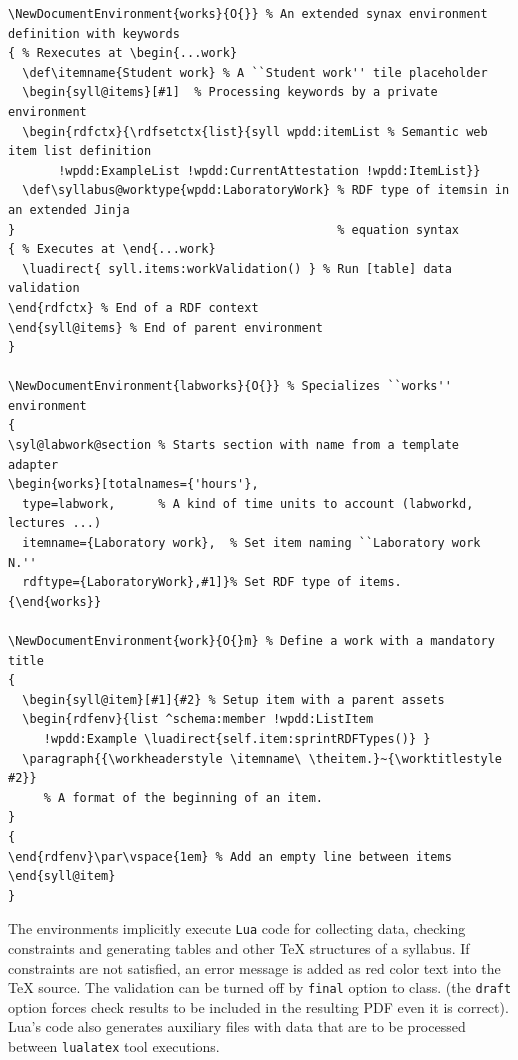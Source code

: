 \documentclass[
]{aiitart}
\begin{document}
\begin{verbatim}
\NewDocumentEnvironment{works}{O{}} % An extended synax environment definition with keywords
{ % Rexecutes at \begin{...work}
  \def\itemname{Student work} % A ``Student work'' tile placeholder
  \begin{syll@items}[#1]  % Processing keywords by a private environment
  \begin{rdfctx}{\rdfsetctx{list}{syll wpdd:itemList % Semantic web item list definition
       !wpdd:ExampleList !wpdd:CurrentAttestation !wpdd:ItemList}}
  \def\syllabus@worktype{wpdd:LaboratoryWork} % RDF type of itemsin in an extended Jinja
}                                             % equation syntax
{ % Executes at \end{...work}
  \luadirect{ syll.items:workValidation() } % Run [table] data validation
\end{rdfctx} % End of a RDF context
\end{syll@items} % End of parent environment
}

\NewDocumentEnvironment{labworks}{O{}} % Specializes ``works'' environment
{
\syl@labwork@section % Starts section with name from a template adapter
\begin{works}[totalnames={'hours'},
  type=labwork,      % A kind of time units to account (labworkd, lectures ...)
  itemname={Laboratory work},  % Set item naming ``Laboratory work N.''
  rdftype={LaboratoryWork},#1]}% Set RDF type of items.
{\end{works}}

\NewDocumentEnvironment{work}{O{}m} % Define a work with a mandatory title
{
  \begin{syll@item}[#1]{#2} % Setup item with a parent assets
  \begin{rdfenv}{list ^schema:member !wpdd:ListItem
     !wpdd:Example \luadirect{self.item:sprintRDFTypes()} }
  \paragraph{{\workheaderstyle \itemname\ \theitem.}~{\worktitlestyle #2}}
     % A format of the beginning of an item.
}
{
\end{rdfenv}\par\vspace{1em} % Add an empty line between items
\end{syll@item}
}
\end{verbatim}

The environments implicitly execute \verb|Lua| code for collecting data, checking constraints and generating tables and other \TeX{} structures of a syllabus.  If constraints are not satisfied, an error message is added as red color text into the \TeX{} source.   The validation can be turned off by \verb|final| option to class. (the \verb|draft| option forces check results to be included in the resulting PDF even it is correct).
Lua's code also generates auxiliary files with data that are to be processed between \verb|lualatex| tool executions.
\end{document}
